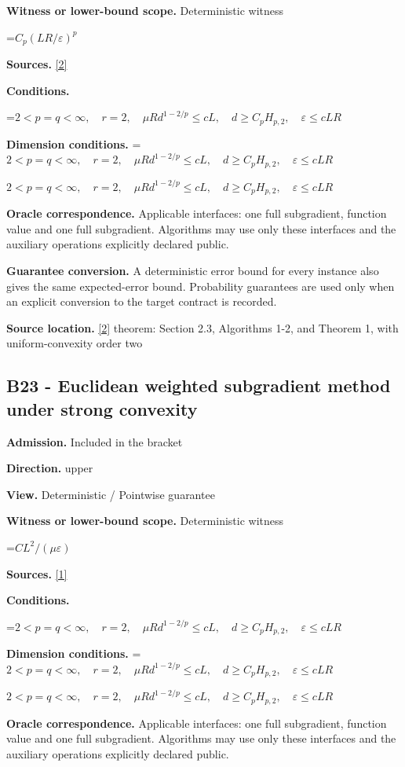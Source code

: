 \documentclass[10pt,a4paper]{article}
\newcommand{\AtlasMath}[1]{\par\begingroup\centering\setbox0=\hbox{$\displaystyle #1$}\ifdim\wd0>1.4\linewidth\typeout{ATLAS WIDE FORMULA: \the\wd0}\fi\ifdim\wd0>\linewidth\resizebox{\linewidth}{!}{\box0}\else\box0\fi\par\endgroup}
\newcommand{\AtlasInlineMath}[1]{\begingroup\setbox0=\hbox{$#1$}\ifdim\wd0>.4\linewidth\endgroup\AtlasMath{#1}\else\endgroup$#1$\fi}
\begin{document}
\textbf{Witness or lower-bound scope.} Deterministic witness

\AtlasMath{C_p(LR/\varepsilon)^p}
\textbf{Sources.} \href{https://arxiv.org/pdf/1401.1792}{[2]}

\textbf{Conditions.} 
\AtlasMath{2<p=q<\infty,\quad r=2,\quad\mu R d^{1-2/p}\le cL,\quad d\ge C_pH_{p,2},\quad\varepsilon\le cLR}


\textbf{Dimension conditions.} \AtlasInlineMath{2<p=q<\infty,\quad r=2,\quad\mu R d^{1-2/p}\le cL,\quad d\ge C_pH_{p,2},\quad\varepsilon\le cLR}

\textbf{Oracle correspondence.} Applicable interfaces: one full subgradient, function value and one full subgradient. Algorithms may use only these interfaces and the auxiliary operations explicitly declared public.

\textbf{Guarantee conversion.} A deterministic error bound for every instance also gives the same expected-error bound. Probability guarantees are used only when an explicit conversion to the target contract is recorded.

\textbf{Source location.} \href{https://arxiv.org/pdf/1401.1792}{[2]} theorem: Section 2.3, Algorithms 1-2, and Theorem 1, with uniform-convexity order two

\subsection{B23 - Euclidean weighted subgradient method under strong convexity}
\textbf{Admission.} Included in the bracket

\textbf{Direction.} upper

\textbf{View.} Deterministic / Pointwise guarantee

\textbf{Witness or lower-bound scope.} Deterministic witness

\AtlasMath{CL^2/(\mu\varepsilon)}
\textbf{Sources.} \href{https://arxiv.org/pdf/1405.4980}{[1]}

\textbf{Conditions.} 
\AtlasMath{2<p=q<\infty,\quad r=2,\quad\mu R d^{1-2/p}\le cL,\quad d\ge C_pH_{p,2},\quad\varepsilon\le cLR}


\textbf{Dimension conditions.} \AtlasInlineMath{2<p=q<\infty,\quad r=2,\quad\mu R d^{1-2/p}\le cL,\quad d\ge C_pH_{p,2},\quad\varepsilon\le cLR}

\textbf{Oracle correspondence.} Applicable interfaces: one full subgradient, function value and one full subgradient. Algorithms may use only these interfaces and the auxiliary operations explicitly declared public.
\end{document}

